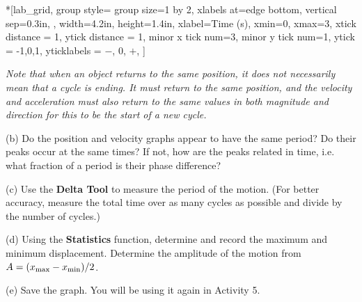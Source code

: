 \begin{lab_groupplot}*{}[lab_grid,
	group style={
		group size=1 by 2,
		xlabels at=edge bottom,
		vertical sep=0.3in,
		},
	width=4.2in,  height=1.4in,
	xlabel=Time (s),
	xmin=0, xmax=3,
	xtick distance = 1, 
	ytick distance = 1, 
	minor x tick num=3,
	minor y tick num=1,
	ytick = {-1,0,1},
	yticklabels = {$-$, 0, $+$},
	]
\nextgroupplot[
	ytick distance = 1, 
	minor y tick num=3,
	ymin=0,ymax=1, 
	ylabel={Position (m)},
	]
\nextgroupplot[
	ymin=-1,ymax=1, 
	ylabel={Velocity (m/s)},
	]
\end{lab_groupplot}

\textit{Note that when an object returns to the same position, it 
does not necessarily mean that a cycle is ending. It must return to the same 
position, and the velocity and acceleration must also return to the same 
values in both magnitude and direction for this to be the start of a new cycle.}


(b) Do the position and velocity graphs appear to have the same period? Do their
peaks occur at the same times? If not, how are the peaks related in time, i.e. 
what fraction of a period is their phase difference?
\vspace{20mm}

(c) Use the \textbf{Delta Tool} to measure the period of the motion. (For
better accuracy, measure the total time over as many cycles as possible and
divide by the number of cycles.)
\vspace{20mm}

(d) Using the \textbf{Statistics} function, determine and record the maximum and minimum 
displacement.  Determine the amplitude of the motion from $A = (x_{\rm max} - x_{\rm min})/2$.
\vspace{20mm}

(e) Save the graph. You will be using it again in Activity 5.

